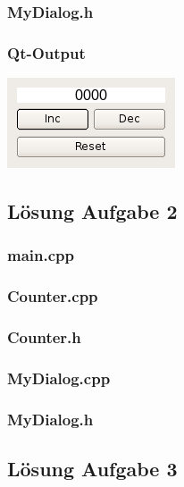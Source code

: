 \subsubsection{MyDialog.h}

\subsubsection{Qt-Output}
\begin{center}
	\includegraphics[scale=.5]{./images/u13a1.png}
\end{center}

\subsection{Lösung Aufgabe 2}
\subsubsection{main.cpp}

\subsubsection{Counter.cpp}

\subsubsection{Counter.h}

\subsubsection{MyDialog.cpp}

\subsubsection{MyDialog.h}


\subsection{Lösung Aufgabe 3}
